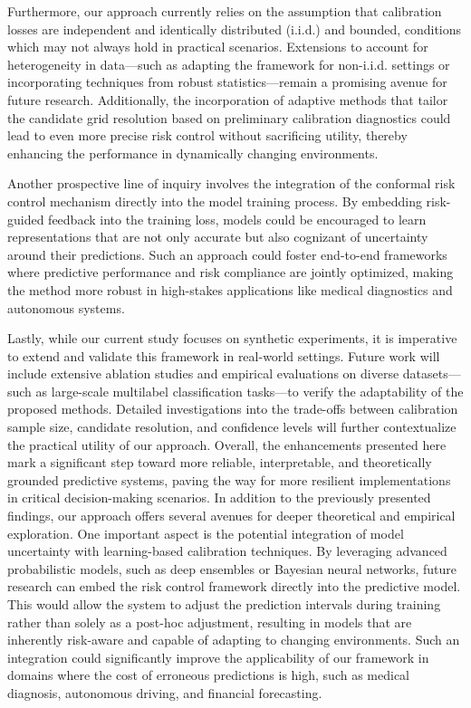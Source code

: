\documentclass{article} %
\begin{document}
Furthermore, our approach currently relies on the assumption that calibration losses are independent and identically distributed (i.i.d.) and bounded, conditions which may not always hold in practical scenarios. Extensions to account for heterogeneity in data—such as adapting the framework for non-i.i.d. settings or incorporating techniques from robust statistics—remain a promising avenue for future research. Additionally, the incorporation of adaptive methods that tailor the candidate grid resolution based on preliminary calibration diagnostics could lead to even more precise risk control without sacrificing utility, thereby enhancing the performance in dynamically changing environments.

Another prospective line of inquiry involves the integration of the conformal risk control mechanism directly into the model training process. By embedding risk-guided feedback into the training loss, models could be encouraged to learn representations that are not only accurate but also cognizant of uncertainty around their predictions. Such an approach could foster end-to-end frameworks where predictive performance and risk compliance are jointly optimized, making the method more robust in high-stakes applications like medical diagnostics and autonomous systems.

Lastly, while our current study focuses on synthetic experiments, it is imperative to extend and validate this framework in real-world settings. Future work will include extensive ablation studies and empirical evaluations on diverse datasets—such as large-scale multilabel classification tasks—to verify the adaptability of the proposed methods. Detailed investigations into the trade-offs between calibration sample size, candidate resolution, and confidence levels will further contextualize the practical utility of our approach. Overall, the enhancements presented here mark a significant step toward more reliable, interpretable, and theoretically grounded predictive systems, paving the way for more resilient implementations in critical decision-making scenarios.
In addition to the previously presented findings, our approach offers several avenues for deeper theoretical and empirical exploration. One important aspect is the potential integration of model uncertainty with learning-based calibration techniques. By leveraging advanced probabilistic models, such as deep ensembles or Bayesian neural networks, future research can embed the risk control framework directly into the predictive model. This would allow the system to adjust the prediction intervals during training rather than solely as a post-hoc adjustment, resulting in models that are inherently risk-aware and capable of adapting to changing environments. Such an integration could significantly improve the applicability of our framework in domains where the cost of erroneous predictions is high, such as medical diagnosis, autonomous driving, and financial forecasting.
\end{document}
